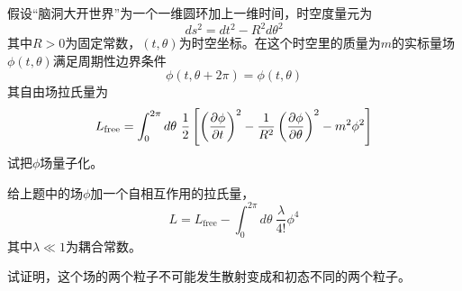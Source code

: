 \documentclass[CJK]{beamer}
\begin{document}
\begin{frame}
\bch
假设“脑洞大开世界”为一个一维圆环加上一维时间，时空度量元为
$$ds^2 = dt^2 - R^2 d\theta^2$$
其中$R>0$为固定常数，$(t,\theta)$为时空坐标。在这个时空里的质量为$m$的实标量场$\phi(t,\theta)$满足周期性边界条件
$$\phi(t,\theta+2\pi) = \phi(t,\theta)$$
其自由场拉氏量为
$$L_{\rm free} = \int_0^{2\pi}d\theta\ \frac{1}{2}\left[\left(\frac{\partial\phi}{\partial t}\right)^2-\frac{1}{R^2}\left(\frac{\partial\phi}{\partial\theta}\right)^2-m^2\phi^2\right]$$
试把$\phi$场量子化。

\ech
\end{frame}


\begin{frame}
\bch
给上题中的场$\phi$加一个自相互作用的拉氏量，
$$L = L_{\mathrm{free}} - \int_0^{2\pi}d\theta\ \frac{\lambda}{4!}\phi^4$$
其中$\lambda\ll 1$为耦合常数。

试证明，这个场的两个粒子不可能发生散射变成和初态不同的两个粒子。

\ech
\end{frame}
\end{document}
